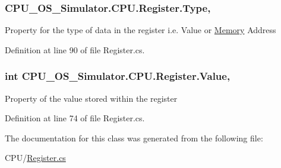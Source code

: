 \subsubsection[{Type}]{ C\+P\+U\+\_\+\+O\+S\+\_\+\+Simulator.\+C\+P\+U.\+Register.\+Type\hspace{0.3cm}{\ttfamily [get]}, {\ttfamily [set]}}\label{class_c_p_u___o_s___simulator_1_1_c_p_u_1_1_register_ac9df7ddedb74ab974a57a334b42e0381}


Property for the type of data in the register i.\+e. Value or \hyperlink{namespace_c_p_u___o_s___simulator_1_1_memory}{Memory} Address 



Definition at line 90 of file Register.\+cs.

\hypertarget{class_c_p_u___o_s___simulator_1_1_c_p_u_1_1_register_a1cabe4ad65d4dc6267be9f34d682e181}{}
\subsubsection[{Value}]{\setlength{\rightskip}{0pt plus 5cm}int C\+P\+U\+\_\+\+O\+S\+\_\+\+Simulator.\+C\+P\+U.\+Register.\+Value\hspace{0.3cm}{\ttfamily [get]}, {\ttfamily [set]}}\label{class_c_p_u___o_s___simulator_1_1_c_p_u_1_1_register_a1cabe4ad65d4dc6267be9f34d682e181}


Property of the value stored within the register 



Definition at line 74 of file Register.\+cs.



The documentation for this class was generated from the following file\+:\begin{DoxyCompactItemize}
\item 
C\+P\+U/\hyperlink{_register_8cs}{Register.\+cs}\end{DoxyCompactItemize}
